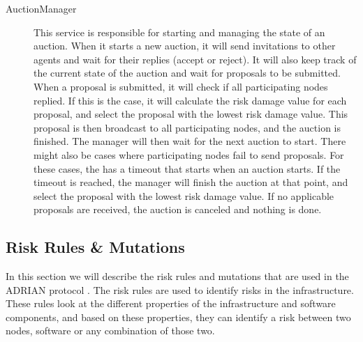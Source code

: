 \begin{description}
    \item[AuctionManager] This service is responsible for starting and managing the state of an auction. When it starts a new auction, it will send invitations to other agents and wait for their replies (accept or reject). It will also keep track of the current state of the auction and wait for proposals to be submitted. When a proposal is submitted, it will check if all participating nodes replied. If this is the case, it will calculate the risk damage value for each proposal, and select the proposal with the lowest risk damage value. This proposal is then broadcast to all participating nodes, and the auction is finished. The manager will then wait for the next auction to start. There might also be cases where participating nodes fail to send proposals. For these cases, the  has a timeout that starts when an auction starts. If the timeout is reached, the manager will finish the auction at that point, and select the proposal with the lowest risk damage value. If no applicable proposals are received, the auction is canceled and nothing is done.
\end{description}




\subsection{Risk Rules \& Mutations}
\label{ssec:risk-rules-mutations}
In this section we will describe the risk rules and mutations that are used in the ADRIAN protocol \cite{mann2023ADRIAN}. The risk rules are used to identify risks in the infrastructure. These rules look at the different properties of the infrastructure and software components, and based on these properties, they can identify a risk between two nodes, software or any combination of those two. 

